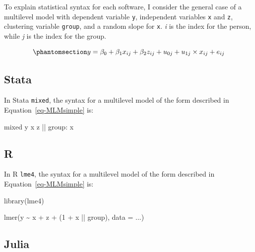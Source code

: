 \documentclass[
  letterpaper,
  DIV=11,
  numbers=noendperiod]{scrreprt}
\newenvironment{Shaded}{\begin{snugshade}}{\end{snugshade}}
\newcommand{\AttributeTok}[1]{\textcolor[rgb]{0.40,0.45,0.13}{#1}}
\newcommand{\DecValTok}[1]{\textcolor[rgb]{0.68,0.00,0.00}{#1}}
\newcommand{\FunctionTok}[1]{\textcolor[rgb]{0.28,0.35,0.67}{#1}}
\newcommand{\NormalTok}[1]{\textcolor[rgb]{0.00,0.23,0.31}{#1}}
\newcommand{\SpecialCharTok}[1]{\textcolor[rgb]{0.37,0.37,0.37}{#1}}
\begin{document}
To explain statistical syntax for each software, I consider the general
case of a multilevel model with dependent variable \texttt{y},
independent variables \texttt{x} and \texttt{z}, clustering variable
\texttt{group}, and a random slope for \texttt{x}. \emph{i} is the index
for the person, while \emph{j} is the index for the group.

\begin{equation}\phantomsection\label{eq-MLMsimple}{y = \beta_0 + \beta_1 x_{ij} + \beta_2 z_{ij} + u_{0j} + u_{1j} \times x_{ij} + e_{ij}}\end{equation}

\subsection{Stata}

In Stata \texttt{mixed}, the syntax for a multilevel model of the form
described in Equation~\ref{eq-MLMsimple} is:

\begin{Shaded}
\begin{Highlighting}[]
\NormalTok{mixed }\FunctionTok{y}\NormalTok{ x z || }\FunctionTok{group}\NormalTok{: x}
\end{Highlighting}
\end{Shaded}

\subsection{R}

In R \texttt{lme4}, the syntax for a multilevel model of the form
described in Equation~\ref{eq-MLMsimple} is:

\begin{Shaded}
\begin{Highlighting}[]
\FunctionTok{library}\NormalTok{(lme4)}

\FunctionTok{lmer}\NormalTok{(y }\SpecialCharTok{\textasciitilde{}}\NormalTok{ x }\SpecialCharTok{+}\NormalTok{ z }\SpecialCharTok{+}\NormalTok{ (}\DecValTok{1} \SpecialCharTok{+}\NormalTok{ x }\SpecialCharTok{||}\NormalTok{ group), }\AttributeTok{data =}\NormalTok{ ...)}
\end{Highlighting}
\end{Shaded}

\subsection{Julia}
\end{document}
